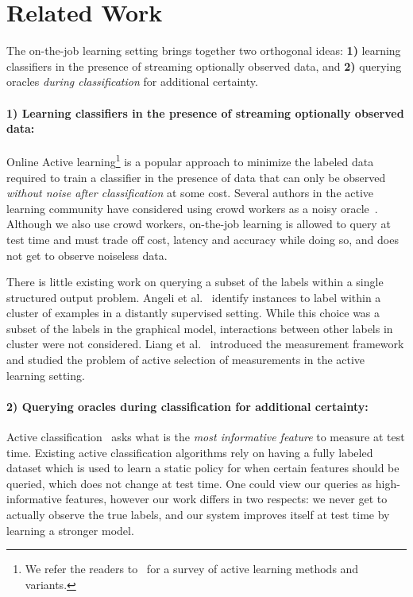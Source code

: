 \section{Related Work}
\label{sec:related}

The on-the-job learning setting brings together two orthogonal ideas: \textbf{1)} learning classifiers in the presence of streaming optionally observed data, and \textbf{2)} querying oracles {\em during classification} for additional certainty.

\paragraph{1) Learning classifiers in the presence of streaming optionally observed data:}

Online Active learning\footnote{We refer the readers to~\cite{settles2010active} for a survey of active learning methods and variants.} is a popular approach to minimize the labeled data required to train a classifier in the presence of data that can only be observed {\em without noise after classification} at some cost.
Several authors in the active learning community have considered using crowd workers as a noisy oracle~\cite{donmez2008proactive,golovin2010near,yan2011active,vijayanarasimhan2014large}.
Although we also use crowd workers, on-the-job learning is allowed to query at test time and must trade off cost, latency and accuracy while doing so, and does not get to observe noiseless data.

There is little existing work on querying a subset of the labels within a single structured output problem.
Angeli et al.~\cite{angeli2014combining} identify instances to label within a cluster of examples in a distantly supervised setting. While this choice was a subset of the labels in the graphical model, interactions between other labels in cluster were not considered.
Liang et al.~\cite{liang09measurements} introduced the measurement framework and studied the problem of active selection of measurements in the active learning setting.

\paragraph{2) Querying oracles during classification for additional certainty:}

Active classification~\cite{greiner2002learning,chai2004test,esmeir2007anytime} asks what is the {\em most informative feature\/} to measure at test time.
Existing active classification algorithms rely on having a fully labeled dataset which is used to learn a static policy for when certain features should be queried, which does not change at test time.
One could view our queries as high-informative features, however our work differs in two respects: we never get to actually observe the true labels, and our system improves itself at test time by learning a stronger model.

